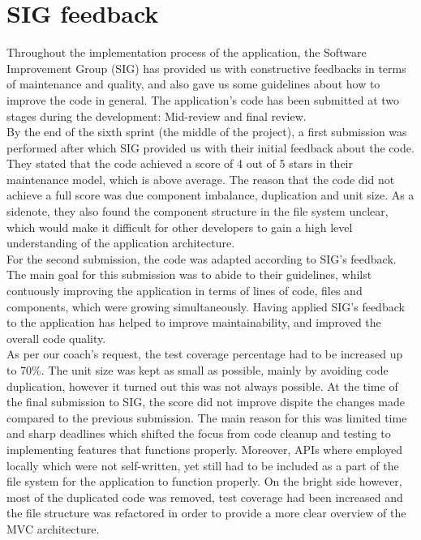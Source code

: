 \section{SIG feedback} %
Throughout the implementation process of the application, the Software Improvement Group (SIG) has provided us with constructive feedbacks in terms of 
maintenance and quality, and also gave us some guidelines about how to improve the code in general. The application's code has been submitted at two 
stages during the development: Mid-review and final review.\\

By the end of the sixth sprint (the middle of the project), a first submission was performed after which SIG provided us with their initial feedback 
about the code. They stated that the code achieved a score of 4 out of 5 stars in their maintenance model, which is above average. The reason that the 
code did not achieve a full score was due component imbalance, duplication and unit size. As a sidenote, they also found the component structure in the 
file system unclear, which would make it difficult for other developers to gain a high level understanding of the application architecture.\\

For the second submission, the code was adapted according to SIG's feedback. The main goal for this submission was to abide to their guidelines, whilst 
contuously improving the application in terms of lines of code, files and components, which were growing simultaneously. Having applied SIG's feedback 
to the application has helped to improve maintainability, and improved the overall code quality.\\
 
As per our coach's request, the test coverage percentage had to be increased up to 70\%. The unit size was kept as small as possible, mainly by avoiding 
code duplication, however it turned out this was not always possible. At the time of the final submission to SIG, the score did not improve dispite the 
changes made compared to the previous submission. The main reason for this was limited time and sharp deadlines which shifted the focus from code 
cleanup and testing to implementing features that functions properly. Moreover, APIs where employed locally which were not self-written, yet still had 
to be included as a part of the file system for the application to function properly. On the bright side however, most of the duplicated code was 
removed, test coverage had been increased and the file structure was refactored in order to provide a more clear overview of the MVC architecture.\\ 